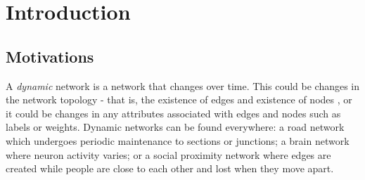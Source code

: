 
\chapter{Introduction}
\label{chap:introduction}
\ifpdf
    \graphicspath{{Introduction/Figures/PNG/}{Introduction/Figures/PDF/}{Introduction/Figures/}}
\else
    \graphicspath{{Introduction/Figures/EPS/}{Introduction/Figures/}}
\fi




\section{Motivations}
\label{motivations}
A \textit{dynamic} network is a network that changes over time. This could be changes in the network topology - that is, the existence of edges and existence of nodes \cite{itdn}, or it could be changes in any attributes associated with edges and nodes such as labels or weights. Dynamic networks can be found everywhere: a road network which undergoes periodic maintenance to sections or junctions; a brain network where neuron activity varies; or a social proximity network where edges are created while people are close to each other and lost when they move apart.

\newline
[Putinapicturehereofadynamicnetwork. ]
\newline



